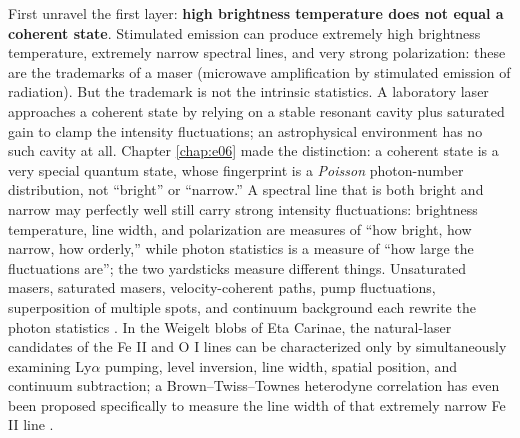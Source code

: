 First unravel the first layer: \textbf{high brightness temperature does not equal a coherent state}. Stimulated emission can produce extremely high brightness temperature, extremely narrow spectral lines, and very strong polarization: these are the trademarks of a maser (microwave amplification by stimulated emission of radiation). But the trademark is not the intrinsic statistics. A laboratory laser approaches a coherent state by relying on a stable resonant cavity plus saturated gain to clamp the intensity fluctuations; an astrophysical environment has no such cavity at all. Chapter \ref{chap:e06} made the distinction: a coherent state is a very special quantum state, whose fingerprint is a \emph{Poisson} photon-number distribution, not ``bright'' or ``narrow.'' A spectral line that is both bright and narrow may perfectly well still carry strong intensity fluctuations: brightness temperature, line width, and polarization are measures of ``how bright, how narrow, how orderly,'' while photon statistics is a measure of ``how large the fluctuations are''; the two yardsticks measure different things. Unsaturated masers, saturated masers, velocity-coherent paths, pump fluctuations, superposition of multiple spots, and continuum background each rewrite the photon statistics \citep{1982RvMP...54.1225E,1992ARA&A..30...75E,1985ARA&A..23..169D}. In the Weigelt blobs of Eta Carinae, the natural-laser candidates of the Fe II and O I lines can be characterized only by simultaneously examining Ly\(\alpha\) pumping, level inversion, line width, spatial position, and continuum subtraction; a Brown--Twiss--Townes heterodyne correlation has even been proposed specifically to measure the line width of that extremely narrow Fe II line \citep{2004A&A...428..497J,2005MNRAS.364..731J,2005NewA...10..361J,2008AIPC..984..216D}.

